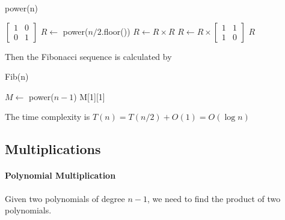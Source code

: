                     \begin{algorithm}[H]
                        \caption{power(n)}
                        \begin{algorithmic}[1]
                                \State \Return $\begin{bmatrix}
                                    1 & 0 \\ 0 & 1
                            \end{bmatrix}$
                            \EndIf
                            \State $R \gets$ power($n/2$.floor())
                            \State $R \gets R \times R$
                                \State $R \gets R \times \begin{bmatrix}
                                    1 & 1 \\ 1 & 0
                                \end{bmatrix}$
                            \EndIf
                            \State \Return $R$
                        \end{algorithmic}
                    \end{algorithm}

                    Then the Fibonacci sequence is calculated by

                    \begin{algorithm}[H]
                        \caption{Fib(n)}
                        \begin{algorithmic}[1]
                                \State {}
                            \EndIf
                            \State $M \gets $ power($n - 1$)
                            \State \Return M[1][1]
                        \end{algorithmic}
                    \end{algorithm}

                    The time complexity is $T(n) = T(n/2) + O(1) = O(\log n)$

            \subsection{Multiplications}
                \paragraph{Polynomial Multiplication}
                    Given two polynomials of degree $n - 1$, we need to find the product of two polynomials.

